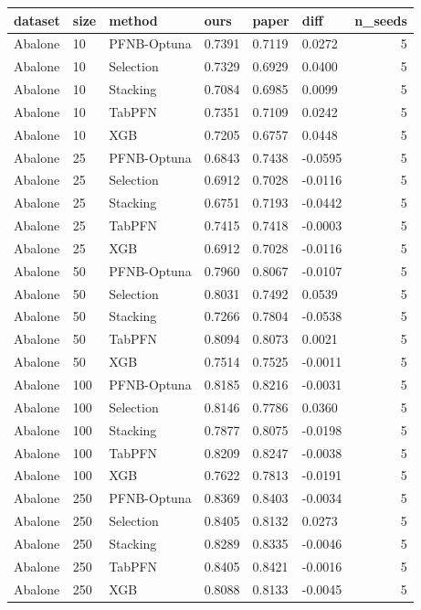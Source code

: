 \begin{tabular}{llllllr}
\toprule
dataset & size & method & ours & paper & diff & n\_seeds \\
\midrule
Abalone & 10 & PFNB-Optuna & 0.7391 & 0.7119 & 0.0272 & 5 \\
Abalone & 10 & Selection & 0.7329 & 0.6929 & 0.0400 & 5 \\
Abalone & 10 & Stacking & 0.7084 & 0.6985 & 0.0099 & 5 \\
Abalone & 10 & TabPFN & 0.7351 & 0.7109 & 0.0242 & 5 \\
Abalone & 10 & XGB & 0.7205 & 0.6757 & 0.0448 & 5 \\
Abalone & 25 & PFNB-Optuna & 0.6843 & 0.7438 & -0.0595 & 5 \\
Abalone & 25 & Selection & 0.6912 & 0.7028 & -0.0116 & 5 \\
Abalone & 25 & Stacking & 0.6751 & 0.7193 & -0.0442 & 5 \\
Abalone & 25 & TabPFN & 0.7415 & 0.7418 & -0.0003 & 5 \\
Abalone & 25 & XGB & 0.6912 & 0.7028 & -0.0116 & 5 \\
Abalone & 50 & PFNB-Optuna & 0.7960 & 0.8067 & -0.0107 & 5 \\
Abalone & 50 & Selection & 0.8031 & 0.7492 & 0.0539 & 5 \\
Abalone & 50 & Stacking & 0.7266 & 0.7804 & -0.0538 & 5 \\
Abalone & 50 & TabPFN & 0.8094 & 0.8073 & 0.0021 & 5 \\
Abalone & 50 & XGB & 0.7514 & 0.7525 & -0.0011 & 5 \\
Abalone & 100 & PFNB-Optuna & 0.8185 & 0.8216 & -0.0031 & 5 \\
Abalone & 100 & Selection & 0.8146 & 0.7786 & 0.0360 & 5 \\
Abalone & 100 & Stacking & 0.7877 & 0.8075 & -0.0198 & 5 \\
Abalone & 100 & TabPFN & 0.8209 & 0.8247 & -0.0038 & 5 \\
Abalone & 100 & XGB & 0.7622 & 0.7813 & -0.0191 & 5 \\
Abalone & 250 & PFNB-Optuna & 0.8369 & 0.8403 & -0.0034 & 5 \\
Abalone & 250 & Selection & 0.8405 & 0.8132 & 0.0273 & 5 \\
Abalone & 250 & Stacking & 0.8289 & 0.8335 & -0.0046 & 5 \\
Abalone & 250 & TabPFN & 0.8405 & 0.8421 & -0.0016 & 5 \\
Abalone & 250 & XGB & 0.8088 & 0.8133 & -0.0045 & 5 \\

\end{tabular}
